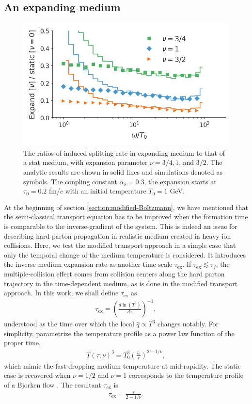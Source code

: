 \documentclass[aps, prc, reprint, amsmath, groupedaddress, nofootinbib]{revtex4-1}
\begin{document}
\subsection{An expanding medium}
\begin{figure}
\includegraphics[width=\columnwidth]{spectrum_Bjorken.png}
\caption{The ratios of induced splitting rate in expanding medium to that of a stat medium, with expansion parameter $\nu = 3/4, 1$, and $3/2$. The analytic results are shown in solid lines and simulations denoted as symbols. The conpling constant $\alpha_s=0.3$, the expansion starts at $\tau_0 = 0.2$ fm/$c$ with an initial temperature $T_0 = 1$ GeV.}
\label{fig:Bjorken-BDMPS}
\end{figure}

At the beginning of section \ref{section:modified-Boltzmann}, we have mentioned that the semi-classical transport equation has to be improved when the formation time is comparable to the inverse-gradient of the system.
This is indeed an issue for describing hard parton propagation in realistic medium created in heavy-ion collisions.
Here, we test the modified transport approach in a simple case that only the temporal change of the medium temperature is considered. 
It introduces the inverse medium expansion rate as another time scale $\tau_{\textrm{ex}}$. 
If $\tau_{\textrm{ex}} \lesssim \tau_f$, the multiple-collision effect comes from collision centers along the hard parton trajectory in the time-dependent medium, as is done in the modified transport approach.
In this work, we shall define $\tau_{\textrm{ex}}$ as
\begin{eqnarray}
\tau_{\textrm{ex}} = \left(\frac{d\ln(T^3)}{d \tau} \right)^{-1},
\end{eqnarray}
understood as the time over which the local $\hat{q}\propto T^3$ changes notably.
For simplicity, parametrize the temperature profile as a power law function of the proper time,
\begin{eqnarray}
T(\tau; \nu)^3 = T_0^3\left(\frac{\tau_0}{\tau}\right)^{2-1/\nu},
\label{eq:temperature}
\end{eqnarray}
which mimic the fast-dropping medium temperature at mid-rapidity.
The static case is recovered when $\nu=1/2$ and $\nu=1$ corresponds to the temperature profile of a Bjorken flow \cite{PhysRevD.27.140}.
The resultant $\tau_{\textrm{ex}}$ is
\begin{eqnarray}
\tau_{\textrm{ex}} = \frac{\tau}{2-1/\nu}.
\end{eqnarray}
\end{document}
